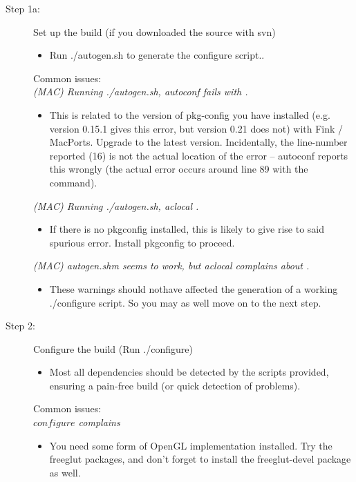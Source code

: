 \begin{description}
	\item[Step 1a:\its] Set up the build (if you downloaded the source with {\sffamily svn})
	\begin{itemize}
		\item Run {\sffamily ./autogen.sh} to generate the {\sffamily configure} script..
	\end{itemize}
	Common issues:\\
	\emph{(MAC) Running {\sffamily ./autogen.sh}, {\sffamily autoconf} fails with .}
	\begin{itemize}
		\item This is related to the version of pkg-config you have installed (e.g. version 0.15.1 gives this error, but version 0.21 does not) with Fink / MacPorts. Upgrade to the latest version. Incidentally, the line-number reported (16) is not the actual location of the error -- autoconf reports this wrongly (the actual error occurs around line 89 with the \qte{PKG\_CHECK\_MODULES(GTK28, ..., [AC\_DEFINE...} command).
	\end{itemize}
	\emph{(MAC) Running {\sffamily ./autogen.sh}, {\sffamily aclocal} .}
	\begin{itemize}
		\item If there is no {\sffamily pkgconfig} installed, this is likely to give rise to said spurious error. Install {\sffamily pkgconfig} to proceed.
	\end{itemize}
	\emph{(MAC) {\sffamily autogen.sh}m seems to work, but {\sffamily aclocal} complains about .}
	\begin{itemize}
		\item These warnings should nothave affected the generation of a working {\sffamily ./configure} script. So you may as well move on to the next step.
	\end{itemize}
\end{description}


\begin{description}
	\item[Step 2:\its] Configure the build (Run {\sffamily./configure})
	\begin{itemize}
		\item Most all dependencies should be detected by the scripts provided, ensuring a pain-free build (or quick detection of problems).
	\end{itemize}
	Common issues:\\
	\emph{$configure$ complains }
	\begin{itemize}
		\item You need some form of OpenGL implementation installed. Try the freeglut packages, and don't forget to install the freeglut-devel package as well.
	\end{itemize}
\end{description}


